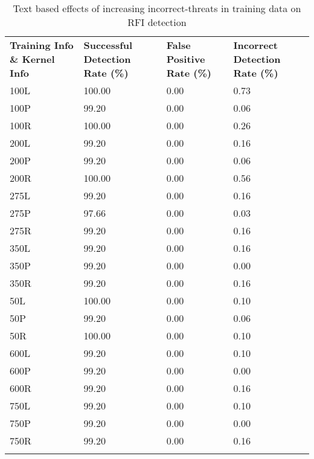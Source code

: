 \begin{appendices}
\begin{longtable}{|p{1.5in}|p{1in}|p{1in}|p{1in}|}
	\hline
	\textbf{Training Info \& Kernel Info} & \textbf{Successful Detection Rate (\%)} & \textbf{False Positive Rate (\%)} & \textbf{Incorrect Detection Rate (\%)}  \\
	\hhline{|=|=|=|=|}
	100L & 100.00 &  0.00 & 0.73 \\ \hline
	100P &  99.20 &  0.00 & 0.06 \\ \hline
	100R & 100.00 &  0.00 & 0.26 \\ \hline
	200L &  99.20 &  0.00 & 0.16 \\ \hline
	200P &  99.20 &  0.00 & 0.06 \\ \hline
	200R & 100.00 &  0.00 & 0.56 \\ \hline
	275L &  99.20 &  0.00 & 0.16 \\ \hline
	275P &  97.66 &  0.00 & 0.03 \\ \hline
	275R &  99.20 &  0.00 & 0.16 \\ \hline
	350L &  99.20 &  0.00 & 0.16 \\ \hline
	350P &  99.20 &  0.00 & 0.00 \\ \hline
	350R &  99.20 &  0.00 & 0.16 \\ \hline
	 50L & 100.00 &  0.00 & 0.10 \\ \hline
	 50P &  99.20 &  0.00 & 0.06 \\ \hline
	 50R & 100.00 &  0.00 & 0.10 \\ \hline
	600L &  99.20 &  0.00 & 0.10 \\ \hline
	600P &  99.20 &  0.00 & 0.00 \\ \hline
	600R &  99.20 &  0.00 & 0.16 \\ \hline
	750L &  99.20 &  0.00 & 0.10 \\ \hline
	750P &  99.20 &  0.00 & 0.00 \\ \hline
	750R &  99.20 &  0.00 & 0.16 \\ \hline
	\caption[]{Text based effects of increasing incorrect-threats in training data on RFI detection}
	\label{app:rfiIncorrectThreatText}
\end{longtable}

\end{appendices}
